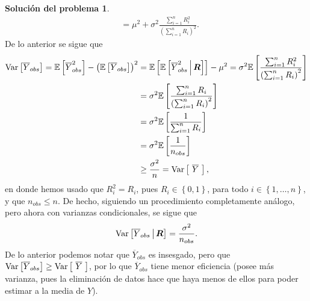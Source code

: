 \documentclass[twoside,12pt]{article}
\theoremstyle{definition}
\newtheorem{soln}{Solución del problema}
\newcommand{\variance}{\mathrm{\normalfont Var}}
\newcommand{\expectation}[1]{\mathbb{E}\left[#1\right]}
\newcommand{\given}{\,\middle|\,}
\begin{document}
\begin{soln}
\[\begin{split}
  &= \mu^2+\sigma^2\frac{\sum_{i=1}^{n} R_i^2}{{\left(\sum_{i=1}^{n} R_i\right)}^2}.
\end{split}
\]
De lo anterior se sigue que
\[
\begin{split}
  \variance \left[\overline{Y}_{obs}\right] = \expectation{\overline{Y}_{obs}^2}-{\left(\expectation{\overline{Y}_{obs}}\right)}^2 &= \expectation{\expectation{\overline{Y}_{obs}^2\given \boldsymbol{R}}}-\mu^2
  = \sigma^2 \expectation{\frac{\sum_{i=1}^{n} R_i^2}{{\left(\sum_{i=1}^{n} R_i\right)}^2}}\\
  &= \sigma^2 \expectation{\frac{\sum_{i=1}^{n} R_i}{{\left(\sum_{i=1}^{n} R_i\right)}^2}}\\
  &= \sigma^2 \expectation{\frac{1}{\sum_{i=1}^{n} R_i}}\\
  &= \sigma^2 \expectation{\frac{1}{n_{obs}}}\\
  &\geq \frac{\sigma^2}{n} = \variance \left[\ \overline{Y}\ \right],
\end{split}
\]
en donde hemos usado que $R_i^2 = R_i$, pues $R_i\in \left\lbrace 0, 1 \right\rbrace$, para todo $i\in \left\lbrace 1, \ldots, n \right\rbrace$, y que $n_{obs}\leq n$. De hecho, siguiendo un procedimiento completamente análogo, pero ahora con varianzas condicionales, se sigue que
\[
\variance \left[\overline{Y}_{obs} \given \boldsymbol{R}\right] = \frac{\sigma^2}{n_{obs}}.
\]
De lo anterior podemos notar que $\overline{Y}_{obs}$ es insesgado, pero que $\variance \left[\overline{Y}_{obs}\right] \geq \variance \left[\ \overline{Y}\ \right]$, por lo que $\overline{Y}_{obs}$ tiene menor eficiencia (posee más varianza, pues la eliminación de datos hace que haya menos de ellos para poder estimar a la media de $Y$).
\end{soln}
\end{document}
